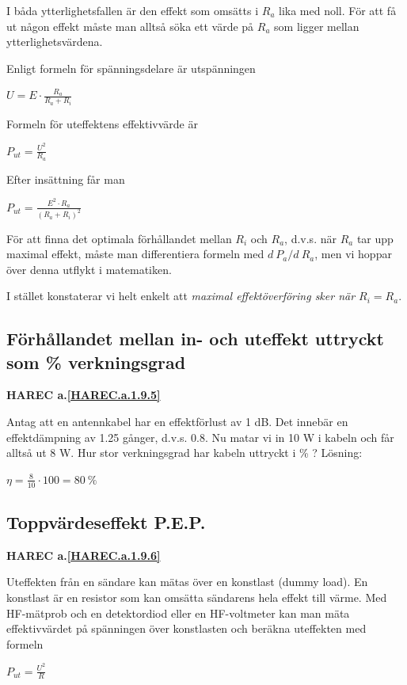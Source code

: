 I båda ytterlighetsfallen är den effekt som omsätts i \(R_a\) lika med noll.
För att få ut någon effekt måste man alltså söka ett värde på \(R_a\) som
ligger mellan ytterlighetsvärdena.

Enligt formeln för spänningsdelare är utspänningen

\(U = E \cdot \frac{R_a}{R_a+R_i}\)

Formeln för uteffektens effektivvärde är

\(P_{ut} = \frac{U^2}{R_a}\)

Efter insättning får man

\(P_{ut} = \frac{E^2 \cdot R_a}{(R_a + R_i)^2}\)

För att finna det optimala förhållandet mellan \(R_i\) och \(R_a\), d.v.s. när
\(R_a\) tar upp maximal effekt, måste man differentiera formeln med \(d\ P_a/d\ R_a\), men vi hoppar över denna utflykt i matematiken.

I stället konstaterar vi helt enkelt att \emph{maximal effektöverföring sker när
\(R_i = R_a\)}.

\subsection{Förhållandet mellan in- och uteffekt uttryckt som \% verkningsgrad}
\textbf{HAREC a.\ref{HAREC.a.1.9.5}\label{myHAREC.a.1.9.5}}

Antag att en antennkabel har en effektförlust av 1 dB. Det innebär en
effektdämpning av 1.25 gånger, d.v.s. 0.8. Nu matar vi in 10 W i kabeln och får
alltså ut 8 W. Hur stor verkningsgrad har kabeln uttryckt i \% ?
Lösning:

\(\eta = \frac{8}{10} \cdot 100 = 80\ \%\)

\subsection{Toppvärdeseffekt P.E.P.}
\textbf{HAREC a.\ref{HAREC.a.1.9.6}\label{myHAREC.a.1.9.6}}

Uteffekten från en sändare kan mätas över en konstlast (dummy load). En
konstlast är en resistor som kan omsätta sändarens hela effekt till värme. Med
HF-mätprob och en detektordiod eller en HF-voltmeter kan man mäta
effektivvärdet på spänningen över konstlasten och beräkna uteffekten med
formeln

\(P_{ut} = \frac{U^2}{R}\)

